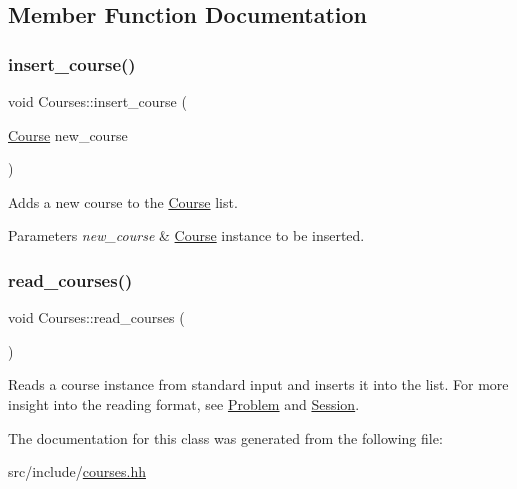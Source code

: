 \subsection{Member Function Documentation}
\mbox{\label{classCourses_aa517f12f1ebd7bbbcbca54db4bb50fcf}} 
\subsubsection{\texorpdfstring{insert\+\_\+course()}{insert\_course()}}
{\footnotesize\ttfamily void Courses\+::insert\+\_\+course (\begin{DoxyParamCaption}\item[{\hyperlink{classCourse}{Course}}]{new\+\_\+course }\end{DoxyParamCaption})}

Adds a new course to the \hyperlink{classCourse}{Course} list. 
\begin{DoxyParams}{Parameters}
{\em new\+\_\+course} & \hyperlink{classCourse}{Course} instance to be inserted. \\
\hline
\end{DoxyParams}
\mbox{\label{classCourses_abe5ba34cce12ce025329979132bdcfd0}} 
\subsubsection{\texorpdfstring{read\+\_\+courses()}{read\_courses()}}
{\footnotesize\ttfamily void Courses\+::read\+\_\+courses (\begin{DoxyParamCaption}{ }\end{DoxyParamCaption})}

Reads a course instance from standard input and inserts it into the list. For more insight into the reading format, see \hyperlink{classProblem}{Problem} and \hyperlink{classSession}{Session}. 

The documentation for this class was generated from the following file\+:\begin{DoxyCompactItemize}
\item 
src/include/\hyperlink{courses_8hh}{courses.\+hh}\end{DoxyCompactItemize}
